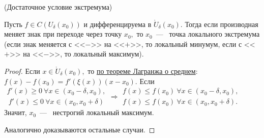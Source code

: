 \begin{theorem}
	\hypertarget{thrm5.22}{(Достаточное условие экстремума)} Пусть $f \in C(U_{\delta}(x_{0}))$ и дифференцируема в $\mathring{U}_{\delta}(x_{0})$. Тогда если производная меняет знак при переходе через точку $x_{0},$ то $x_{0}$~---~ точка локального экстремума (если знак меняется с <<$-$>> на <<$+$>>, то локальный минумум, если с <<$+$>> на <<$-$>>, то локальный максимум). 
\end{theorem}
\begin{proof}
	Если $x\in \mathring{U}_{\delta}(x_{0}),$ то \hyperlink{thrm7.11cor}{по теореме Лагранжа о среднем}: $f(x) - f(x_{0}) = f'(\xi(x))(x-x_{0}).$ Если $\begin{gathered}
		f'(x) \geq 0 \ \forall x\in (x_{0}-\delta, x_{0}), \\
		 \ f'(x) \leq 0 \ \forall x\in (x_{0}, x_{0} + \delta) 
	\end{gathered} \Rightarrow 
	\begin{gathered}
		 f(x) \leq f(x_{0}) \ \forall x\in (x_{0} -\delta, x_{0}), \\
		 f(x) \leq f(x_{0}) \ \forall x \in (x_{0}, x_{0} + \delta).
	\end{gathered}$
	Значит, $x_{0}$~---~ нестрогий локальный максимум.
	
	Аналогично доказываются остальные случаи.
\end{proof}

